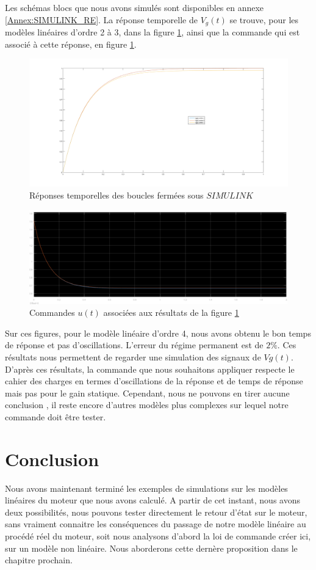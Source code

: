Les schémas blocs que nous avons simulés sont disponibles en annexe \ref{Annex:SIMULINK_RE}. La réponse temporelle de $V_g(t)$ se trouve, pour les modèles linéaires d'ordre 2 à 3, dans la figure \ref{fig:reponseModelesLineairesSIMULINK}, ainsi que la commande qui est associé à cette réponse, en figure \ref{fig:reponseModelesLineairesSIMULINK}.\begin{figure}[!ht]
\centering
\includegraphics[width = .8\textwidth]{./III/figure/res_SIMULINK.png}
\caption{Réponses temporelles des boucles fermées sous $SIMULINK$\label{fig:reponseModelesLineairesSIMULINK}}
\end{figure}


\begin{figure}[!ht]
\centering
\includegraphics[width = .7\textwidth]{./III/figure/commande-u-ML_ordre2-3-4.pdf}
\caption{Commandes $u(t)$ associées aux résultats de la figure \ref{fig:reponseModelesLineairesSIMULINK}\label{fig:commandesML-1V}}
\end{figure}


Sur ces figures, pour le modèle linéaire d'ordre 4, nous avons obtenu le bon temps de réponse et pas d'oscillations. L'erreur du régime permanent est de $2\%$.
Ces résultats nous permettent de regarder une simulation des signaux de $Vg(t)$. D'après ces résultats, la commande que nous souhaitons appliquer respecte le cahier des charges en termes d'oscillations de la réponse et de temps de réponse mais pas pour le gain statique. Cependant, nous ne pouvons en tirer aucune conclusion , il reste encore d'autres modèles plus complexes sur lequel notre commande doit être tester.

\section{Conclusion}
Nous avons maintenant terminé les exemples de simulations sur les modèles linéaires du moteur que nous avons calculé. A partir de cet instant, nous avons deux possibilités, nous pouvons tester directement le retour d'état sur le moteur, sans vraiment connaitre les conséquences du passage de notre modèle linéaire au procédé réel du moteur, soit nous analysons d'abord la loi de commande créer ici, sur un modèle non linéaire. Nous aborderons cette dernère proposition dans le chapitre prochain.


